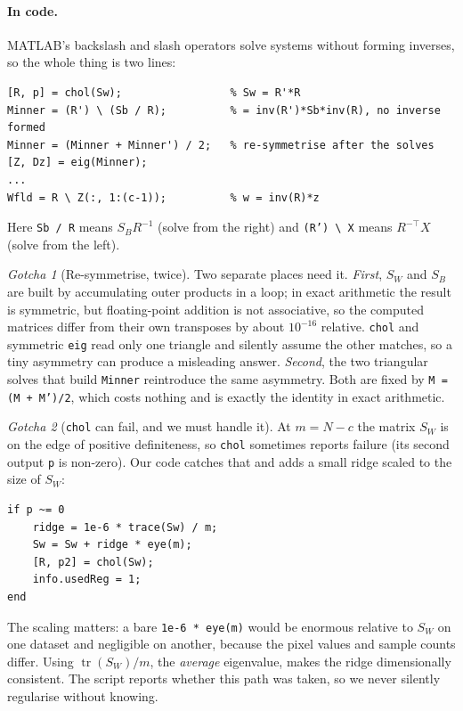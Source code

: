 \documentclass[11pt]{article}
\theoremstyle{definition}
\theoremstyle{remark}
\newtheorem*{gotcha}{Gotcha}
\newcommand{\Sw}{S_W}
\newcommand{\Sb}{S_B}
\newcommand{\tr}{\operatorname{tr}}
\begin{document}
\paragraph{In code.} MATLAB's backslash and slash operators solve systems without
forming inverses, so the whole thing is two lines:
\begin{lstlisting}
[R, p] = chol(Sw);                 % Sw = R'*R
Minner = (R') \ (Sb / R);          % = inv(R')*Sb*inv(R), no inverse formed
Minner = (Minner + Minner') / 2;   % re-symmetrise after the solves
[Z, Dz] = eig(Minner);
...
Wfld = R \ Z(:, 1:(c-1));          % w = inv(R)*z
\end{lstlisting}
Here \texttt{Sb / R} means $\Sb R^{-1}$ (solve from the right) and
\texttt{(R') \textbackslash\ X} means $R^{-\top}X$ (solve from the left).

\begin{gotcha}[Re-symmetrise, twice]
Two separate places need it.
\emph{First}, $\Sw$ and $\Sb$ are built by accumulating outer products in a loop;
in exact arithmetic the result is symmetric, but floating-point addition is not
associative, so the computed matrices differ from their own transposes by about
$10^{-16}$ relative. \texttt{chol} and symmetric \texttt{eig} read only one
triangle and silently assume the other matches, so a tiny asymmetry can produce a
misleading answer. \emph{Second}, the two triangular solves that build
\texttt{Minner} reintroduce the same asymmetry.
Both are fixed by \texttt{M = (M + M')/2}, which costs nothing and is exactly the
identity in exact arithmetic.
\end{gotcha}

\begin{gotcha}[\texttt{chol} can fail, and we must handle it]
At $m=N-c$ the matrix $\Sw$ is on the edge of positive definiteness, so
\texttt{chol} sometimes reports failure (its second output \texttt{p} is non-zero).
Our code catches that and adds a small ridge scaled to the size of $\Sw$:
\begin{lstlisting}
if p ~= 0
    ridge = 1e-6 * trace(Sw) / m;
    Sw = Sw + ridge * eye(m);
    [R, p2] = chol(Sw);
    info.usedReg = 1;
end
\end{lstlisting}
The scaling matters: a bare \texttt{1e-6 * eye(m)} would be enormous relative to
$\Sw$ on one dataset and negligible on another, because the pixel values and
sample counts differ. Using $\tr(\Sw)/m$, the \emph{average} eigenvalue, makes the
ridge dimensionally consistent. The script reports whether this path was taken, so
we never silently regularise without knowing.
\end{gotcha}
\end{document}
